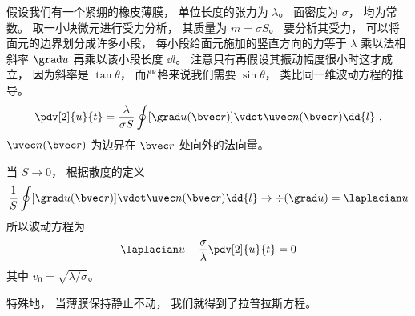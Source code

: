
\begin{issues}
\issueDraft
\end{issues}


假设我们有一个紧绷的橡皮薄膜， 单位长度的张力为 $\lambda$。 面密度为 $\sigma$， 均为常数。 取一小块微元进行受力分析， 其质量为 $m = \sigma S$。 要分析其受力， 可以将面元的边界划分成许多小段， 每小段给面元施加的竖直方向的力等于 $\lambda$ 乘以法相斜率 $\grad u$ 再乘以该小段长度 $\dd{l}$。 注意只有再假设其振动幅度很小时这才成立， 因为斜率是 $\tan\theta$， 而严格来说我们需要 $\sin\theta$， 类比同一维波动方程的推导。
\begin{equation}
\pdv[2]{u}{t} = \frac{\lambda}{\sigma S}\oint [\grad u(\bvec r)] \vdot \uvec n(\bvec r) \dd{l}~,
\end{equation}
$\uvec n(\bvec r)$ 为边界在 $\bvec r$ 处向外的法向量。

当 $S \to 0$， 根据散度的定义
\begin{equation}
\frac{1}{S} \oint [\grad u(\bvec r)] \vdot \uvec n(\bvec r) \dd{l} \to \div (\grad u) = \laplacian u
\end{equation}
所以波动方程为
\begin{equation}
\laplacian u - \frac{\sigma}{\lambda}\pdv[2]{u}{t} = 0
\end{equation}
其中 $v_0 = \sqrt{\lambda/\sigma}$。

特殊地， 当薄膜保持静止不动， 我们就得到了拉普拉斯方程。
